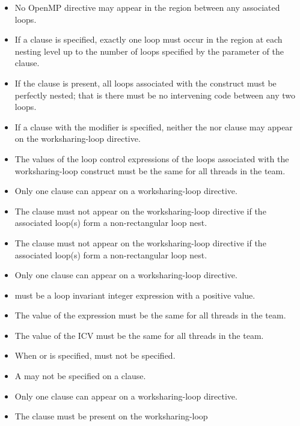 \begin{itemize}
\item No OpenMP directive may appear in the region between any associated loops.
\item If a  clause is specified, exactly one loop must
      occur in the region at each nesting level up to the number of loops
      specified by the parameter of the  clause.
\item If the  clause is present, all loops associated
      with the construct must be perfectly nested; that is there must be
      no intervening code between any two loops.
\item If a  clause with the  modifier is
      specified, neither the  nor  clause
      may appear on the worksharing-loop directive.
\item The values of the loop control expressions of the loops associated with
      the worksharing-loop construct must be the same for all threads in the team.
\item Only one  clause can appear on a worksharing-loop directive.
\item The  clause must not appear on the worksharing-loop
      directive  if the associated loop(s) form a non-rectangular loop nest.
\item The  clause must not appear on the worksharing-loop directive 
      if the associated loop(s) form a non-rectangular loop nest.
\item Only one  clause can appear on a worksharing-loop directive.
\item {} must be a loop invariant integer expression with a 
      positive value.
\item The value of the  expression must be the same for all 
      threads in the team.
\item The value of the  ICV must be the same for all 
      threads in the team.
\item When  or  is specified, 
       must not be specified.
\item A  may not be specified on a  clause.
\item Only one  clause can appear on a worksharing-loop directive.
\item The  clause must be present on the worksharing-loop 

\end{itemize}
